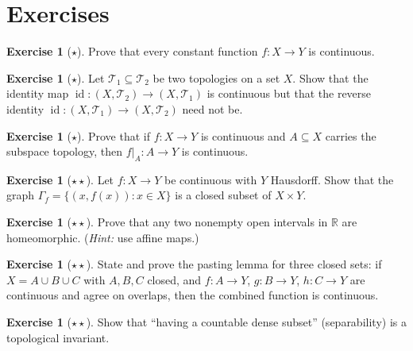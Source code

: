 \documentclass[11pt,a4paper,twoside]{book}
\theoremstyle{remark}
\theoremstyle{definition}
\newtheorem{exerciseplain}[theorem]{Exercise}
\theoremstyle{definition}
\newenvironment{exercise}[1][]{%
  \begin{exerciseplain}[#1]
}{%
  \end{exerciseplain}
}
\begin{document}
\section{Exercises}
\label{sec:continuity-exercises}

\begin{exercise}[$\star$]
\label{exer:const-continuous}
Prove that every constant function $f\colon X\to Y$ is continuous.
\end{exercise}

\begin{exercise}[$\star$]
\label{exer:identity-continuous}
Let $\mathscr{T}_1\subseteq\mathscr{T}_2$ be two topologies on a set $X$.
Show that the identity map $\operatorname{id}\colon(X,\mathscr{T}_2)\to
(X,\mathscr{T}_1)$ is continuous but that the reverse identity
$\operatorname{id}\colon(X,\mathscr{T}_1)\to(X,\mathscr{T}_2)$ need not be.
\end{exercise}

\begin{exercise}[$\star$]
\label{exer:restrict-continuous}
Prove that if $f\colon X\to Y$ is continuous and $A\subseteq X$ carries the
subspace topology, then $f|_A\colon A\to Y$ is continuous.
\end{exercise}

\begin{exercise}[$\star\star$]
\label{exer:closed-graph}
Let $f\colon X\to Y$ be continuous with $Y$ Hausdorff.  Show that the graph
$\Gamma_f=\{(x,f(x)):x\in X\}$ is a closed subset of $X\times Y$.
\end{exercise}

\begin{exercise}[$\star\star$]
\label{exer:homeo-open-intervals}
Prove that any two nonempty open intervals in $\mathbb{R}$ are homeomorphic.
(\textit{Hint:} use affine maps.)
\end{exercise}

\begin{exercise}[$\star\star$]
\label{exer:pasting-three}
State and prove the pasting lemma for three closed sets: if
$X=A\cup B\cup C$ with $A,B,C$ closed, and $f\colon A\to Y$,
$g\colon B\to Y$, $h\colon C\to Y$ are continuous and agree on overlaps, then
the combined function is continuous.
\end{exercise}

\begin{exercise}[$\star\star$]
\label{exer:topological-property}
Show that ``having a countable dense subset'' (separability) is a topological
invariant.
\end{exercise}
\end{document}
